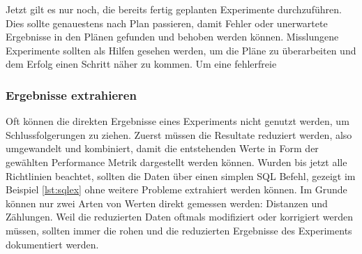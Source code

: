     Jetzt gilt es nur noch, die bereits fertig geplanten Experimente durchzuführen. Dies 
    sollte genauestens nach Plan passieren, damit Fehler oder unerwartete Ergebnisse in den 
    Plänen gefunden und behoben werden können. Misslungene Experimente sollten als Hilfen 
    gesehen werden, um die Pläne zu überarbeiten und dem Erfolg einen Schritt näher zu kommen. 
    Um eine fehlerfreie 


    \subsubsection{Ergebnisse extrahieren}

    Oft können die direkten Ergebnisse eines Experiments nicht genutzt werden, um 
    Schlussfolgerungen zu ziehen. Zuerst müssen die Resultate reduziert werden, also 
    umgewandelt und kombiniert, damit die entstehenden Werte in Form der gewählten 
    Performance Metrik dargestellt werden können. Wurden bis jetzt alle Richtlinien beachtet, 
    sollten die Daten über einen simplen SQL Befehl, gezeigt im Beispiel \ref{lst:sqlex} ohne 
    weitere Probleme extrahiert werden können. Im Grunde können nur zwei Arten von 
    Werten direkt gemessen werden: Distanzen und Zählungen. Weil die reduzierten Daten oftmals 
    modifiziert oder korrigiert werden müssen, sollten immer die rohen und die reduzierten 
    Ergebnisse des Experiments dokumentiert werden.


